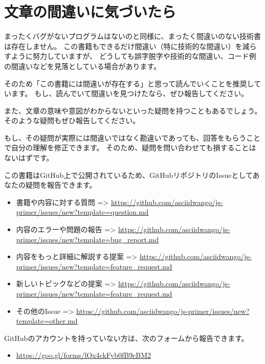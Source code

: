 \hypertarget{how-to-report-mistake}{%
\chapter*{文章の間違いに気づいたら}\label{how-to-report-mistake}}
\thispagestyle{frontheadings}

まったくバグがないプログラムはないのと同様に、まったく間違いのない技術書は存在しません。
この書籍もできるだけ間違い（特に技術的な間違い）を減らすように努力していますが、
どうしても誤字脱字や技術的な間違い、コード例の間違いなどを見落としている場合があります。

そのため「この書籍には間違いが存在する」と思って読んでいくことを推奨しています。
もし、読んでいて間違いを見つけたなら、ぜひ報告してください。

また、文章の意味や意図がわからないといった疑問を持つこともあるでしょう。
そのような疑問もぜひ報告してください。

もし、その疑問が実際には間違いではなく勘違いであっても、回答をもらうことで自分の理解を修正できます。
そのため、疑問を問い合わせても損することはないはずです。

この書籍はGitHub上で公開されているため、GitHubリポジトリのIssueとしてあなたの疑問を報告できます。

\begin{itemize}
\item
  書籍や内容に対する質問 =\textgreater{}
  \url{https://github.com/asciidwango/js-primer/issues/new?template=question.md}
\item
  内容のエラーや問題の報告 =\textgreater{}
  \url{https://github.com/asciidwango/js-primer/issues/new?template=bug_report.md}
\item
  内容をもっと詳細に解説する提案 =\textgreater{}
  \url{https://github.com/asciidwango/js-primer/issues/new?template=feature_request.md}
\item
  新しいトピックなどの提案 =\textgreater{}
  \url{https://github.com/asciidwango/js-primer/issues/new?template=feature_request.md}
\item
  その他のIssue =\textgreater{}
  \url{https://github.com/asciidwango/js-primer/issues/new?template=other.md}
\end{itemize}

GitHubのアカウントを持っていない方は、次のフォームから報告できます。
\begin{itemize}
\item \url{https://goo.gl/forms/lOx4ckFyb0fB9cBM2}
\end{itemize}

